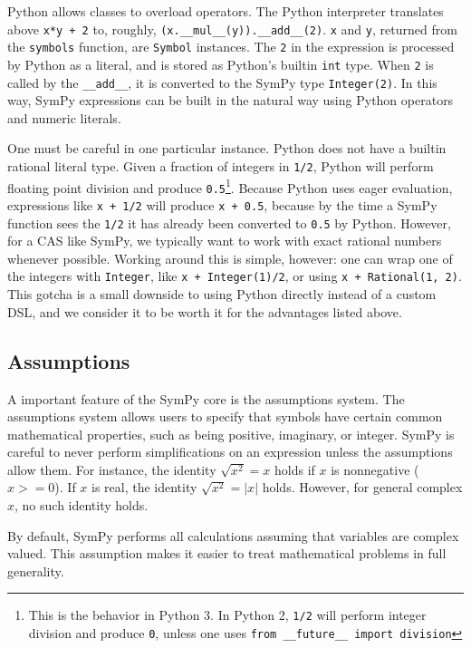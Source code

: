 Python allows classes to overload operators. The Python interpreter translates
above \texttt{x*y + 2} to, roughly,
\verb|(x.__mul__(y)).__add__(2)|. \texttt{x} and \texttt{y}, returned from
the \texttt{symbols} function, are \texttt{Symbol} instances. The \texttt{2}
in the expression is processed by Python as a literal, and is stored as
Python's builtin \texttt{int} type. When \texttt{2} is called by the
\verb|__add__|, it is converted to the SymPy type \texttt{Integer(2)}. In
this way, SymPy expressions can be built in the natural way using Python
operators and numeric literals.

One must be careful in one particular instance. Python does not have a builtin
rational literal type. Given a fraction of integers in \texttt{1/2}, Python
will perform floating point division and produce \texttt{0.5}\footnote{This is
  the behavior in Python 3. In Python 2, \texttt{1/2} will perform integer
  division and produce \texttt{0}, unless one uses \texttt{from \_\_future\_\_
    import division}}. Because Python uses eager evaluation, expressions like
\texttt{x + 1/2} will produce \texttt{x + 0.5}, because by the time a SymPy
function sees the \texttt{1/2} it has already been converted to \texttt{0.5}
by Python. However, for a CAS like SymPy, we typically want to work with exact
rational numbers whenever possible. Working around this is simple, however:
one can wrap one of the integers with \texttt{Integer}, like \texttt{x +
  Integer(1)/2}, or using \texttt{x + Rational(1, 2)}. This gotcha is a small
downside to using Python directly instead of a custom DSL, and we consider it
to be worth it for the advantages listed above.

\subsection{Assumptions}

A important feature of the SymPy core is the assumptions system. The
assumptions system allows users to specify that symbols have certain common
mathematical properties, such as being positive, imaginary, or integer. SymPy
is careful to never perform simplifications on an expression unless the
assumptions allow them. For instance, the identity $\sqrt{x^2} = x$ holds if
$x$ is nonnegative ($x>=0$). If $x$ is real, the identity $\sqrt{x^2}=|x|$
holds. However, for general complex $x$, no such identity holds.

By default, SymPy performs all calculations assuming that variables are
complex valued. This assumption makes it easier to treat mathematical problems
in full generality.

